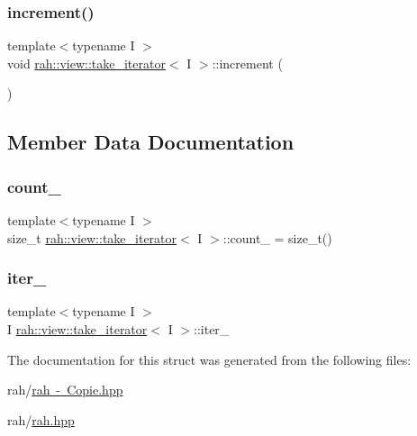 \mbox{\label{structrah_1_1view_1_1take__iterator_a5a1663517c2525b6cd6ed27f82047ba8}} 
\subsubsection{\texorpdfstring{increment()}{increment()}\hspace{0.1cm}{\footnotesize\ttfamily [2/2]}}
{\footnotesize\ttfamily template$<$typename I $>$ \\
void \mbox{\hyperlink{structrah_1_1view_1_1take__iterator}{rah\+::view\+::take\+\_\+iterator}}$<$ I $>$\+::increment (\begin{DoxyParamCaption}{ }\end{DoxyParamCaption})\hspace{0.3cm}{\ttfamily [inline]}}



\subsection{Member Data Documentation}
\mbox{\label{structrah_1_1view_1_1take__iterator_a7d7c6fd1c6eed6192f1f51da04d5ede1}} 
\subsubsection{\texorpdfstring{count\_}{count\_}}
{\footnotesize\ttfamily template$<$typename I $>$ \\
size\+\_\+t \mbox{\hyperlink{structrah_1_1view_1_1take__iterator}{rah\+::view\+::take\+\_\+iterator}}$<$ I $>$\+::count\+\_\+ = size\+\_\+t()}

\mbox{\label{structrah_1_1view_1_1take__iterator_abbc947797abfa6ecaeb91c8185212152}} 
\subsubsection{\texorpdfstring{iter\_}{iter\_}}
{\footnotesize\ttfamily template$<$typename I $>$ \\
I \mbox{\hyperlink{structrah_1_1view_1_1take__iterator}{rah\+::view\+::take\+\_\+iterator}}$<$ I $>$\+::iter\+\_\+}



The documentation for this struct was generated from the following files\+:\begin{DoxyCompactItemize}
\item 
rah/\mbox{\hyperlink{rah_01-_01_copie_8hpp}{rah -\/ Copie.\+hpp}}\item 
rah/\mbox{\hyperlink{rah_8hpp}{rah.\+hpp}}\end{DoxyCompactItemize}
